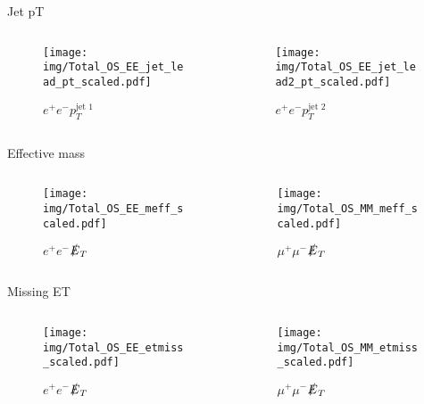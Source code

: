 \documentclass{beamer}
\begin{document}
\begin{frame}{Jet pT}
  \begin{columns}
    \begin{column}{0.45\textwidth}\begin{figure}
      \caption{$e^{+}e^{-}$$p_{T}^{\text{jet 1}}$}
      \texttt{[image: img/Total\_OS\_EE\_jet\_lead\_pt\_scaled.pdf]}
    \end{figure}\end{column}
    \begin{column}{0.45\textwidth}\begin{figure}
      \caption{$e^{+}e^{-}$$p_{T}^{\text{jet 2}}$}
      \texttt{[image: img/Total\_OS\_EE\_jet\_lead2\_pt\_scaled.pdf]}
    \end{figure}\end{column}
  \end{columns}
\end{frame}

\begin{frame}{Effective mass}
  \begin{columns}
    \begin{column}{0.45\textwidth}\begin{figure}
      \caption{$e^{+}e^{-}$$\slashed{E}_{T}$}
      \texttt{[image: img/Total\_OS\_EE\_meff\_scaled.pdf]}
    \end{figure}\end{column}
    \begin{column}{0.45\textwidth}\begin{figure}
      \caption{$\mu^{+}\mu^{-}$$\slashed{E}_{T}$}
      \texttt{[image: img/Total\_OS\_MM\_meff\_scaled.pdf]}
    \end{figure}\end{column}
  \end{columns}
\end{frame}

\begin{frame}{Missing ET}
  \begin{columns}
    \begin{column}{0.45\textwidth}\begin{figure}
      \caption{$e^{+}e^{-}$$\slashed{E}_{T}$}
      \texttt{[image: img/Total\_OS\_EE\_etmiss\_scaled.pdf]}
    \end{figure}\end{column}
    \begin{column}{0.45\textwidth}\begin{figure}
      \caption{$\mu^{+}\mu^{-}$$\slashed{E}_{T}$}
      \texttt{[image: img/Total\_OS\_MM\_etmiss\_scaled.pdf]}
    \end{figure}\end{column}
  \end{columns}
\end{frame}
\end{document}
